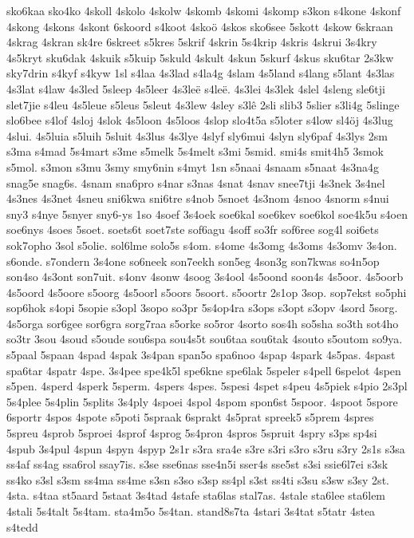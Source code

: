{sko6kaa
sko4ko
4skoll
4skolo
4skolw
4skomb
4skomi
4skomp
s3kon
s4kone
4skonf
4skong
4skons
4skont
6skoord
s4koot
4skoö
4skos
sko6see
5skott
4skow
6skraan
4skrag
4skran
sk4re
6skreet
s5kres
5skrif
4skrin
5s4krip
4skris
4skrui
3s4kry
4s5kryt
sku6dak
4skuik
s5kuip
5skuld
4skult
4skun
5skurf
4skus
sku6tar
2s3kw
sky7drin
s4kyf
s4kyw
1sl
s4laa
4s3lad
s4la4g
4slam
4s5land
s4lang
s5lant
4s3las
4s3lat
s4law
4s3led
5sleep
4s5leer
4s3leë
s4leë.
4s3lei
4s3lek
4slel
4sleng
sle6tji
slet7jie
s4leu
4s5leue
s5leus
5sleut
4s3lew
4sley
s3lê
2sli
slib3
5slier
s3li4g
5slinge
slo6bee
s4lof
4sloj
4slok
4s5loon
4s5loos
4slop
slo4t5a
s5loter
s4low
sl4öj
4s3lug
4slui.
4s5luia
s5luih
5sluit
4s3lus
4s3lye
4slyf
sly6mui
4slyn
sly6paf
4s3lys
2sm
s3ma
s4mad
5s4mart
s3me
s5melk
5s4melt
s3mi
5smid.
smi4s
smit4h5
3smok
s5mol.
s3mon
s3mu
3smy
smy6nin
s4myt
1sn
s5naai
4snaam
s5naat
4s3na4g
snag5e
snag6s.
4snam
sna6pro
s4nar
s3nas
4snat
4snav
snee7tji
4s3nek
3s4nel
4s3nes
4s3net
4sneu
sni6kwa
sni6tre
s4nob
5snoet
4s3nom
4snoo
4snorm
s4nui
sny3
s4nye
5snyer
sny6-ys
1so
4soef
3s4oek
soe6kal
soe6kev
soe6kol
soe4k5u
s4oen
soe6nys
4soes
5soet.
soets6t
soet7ste
sof6agu
4soff
so3fr
sof6ree
sog4l
soi6ets
sok7opho
3sol
s5olie.
sol6lme
solo5s
s4om.
s4ome
4s3omg
4s3oms
4s3omv
3s4on.
s6onde.
s7ondern
3s4one
so6neek
son7eekh
son5eg
4son3g
son7kwas
so4n5op
son4so
4s3ont
son7uit.
s4onv
4sonw
4soog
3s4ool
4s5oond
soon4s
4s5oor.
4s5oorb
4s5oord
4s5oore
s5oorg
4s5oorl
s5oors
5soort.
s5oortr
2s1op
3sop.
sop7ekst
so5phi
sop6hok
s4opi
5sopie
s3opl
3sopo
so3pr
5s4op4ra
s3ops
s3opt
s3opv
4sord
5sorg.
4s5orga
sor6gee
sor6gra
sorg7raa
s5orke
so5ror
4sorto
sos4h
so5sha
so3th
sot4ho
so3tr
3sou
4soud
s5oude
sou6spa
sou4s5t
sou6taa
sou6tak
4souto
s5outom
so9ya.
s5paal
5spaan
4spad
4spak
3s4pan
span5o
spa6noo
4spap
4spark
4s5pas.
4spast
spa6tar
4spatr
4spe.
3s4pee
spe4k5l
spe6kne
spe6lak
5speler
s4pell
6spelot
4spen
s5pen.
4sperd
4sperk
5sperm.
4spers
4spes.
5spesi
4spet
s4peu
4s5piek
s4pio
2s3pl
5s4plee
5s4plin
5splits
3s4ply
4spoei
4spol
4spom
spon6st
5spoor.
4spoot
5spore
6sportr
4spos
4spote
s5poti
5spraak
6sprakt
4s5prat
spreek5
s5prem
4spres
5spreu
4sprob
5sproei
4sprof
4sprog
5s4pron
4spros
5spruit
4spry
s3ps
sp4si
4spub
3s4pul
4spun
4spyn
4spyp
2s1r
s3ra
sra4e
s3re
s3ri
s3ro
s3ru
s3ry
2s1s
s3sa
ss4af
ss4ag
ssa6rol
ssay7is.
s3se
sse6nas
sse4n5i
sser4s
sse5st
s3si
ssie6l7ei
s3sk
ss4ko
s3sl
s3sm
ss4ma
ss4me
s3sn
s3so
s3sp
ss4pl
s3st
ss4ti
s3su
s3sw
s3sy
2st.
4sta.
s4taa
st5aard
5staat
3s4tad
4stafe
sta6las
stal7as.
4stale
sta6lee
sta6lem
4stali
5s4talt
5s4tam.
sta4m5o
5s4tan.
stand8s7ta
4stari
3s4tat
s5tatr
4stea
s4tedd
}
